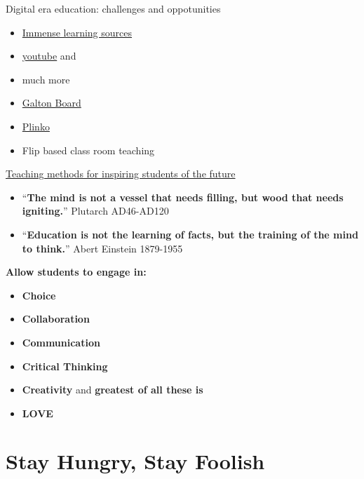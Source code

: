\documentclass[
  ignorenonframetext,
]{beamer}
\providecommand{\tightlist}{%
  \setlength{\itemsep}{0pt}\setlength{\parskip}{0pt}}\usepackage{longtable,booktabs,array}
\begin{document}
\begin{frame}{Digital era education: challenges and oppotunities}
\protect\hypertarget{digital-era-education-challenges-and-oppotunities}{}
\begin{itemize}
\tightlist
\item
  \href{khanacademy.com}{Immense learning sources}
\item
  \href{youtube.com}{youtube} and
\item
  much more
\item
  \href{https://galtonboard.com/}{Galton Board}
\item
  \href{https://phet.colorado.edu/sims/html/plinko-probability/latest/plinko-probability_en.html}{Plinko}
\item
  Flip based class room teaching
\end{itemize}
\end{frame}

\begin{frame}{}
\protect\hypertarget{section-6}{}
\href{https://www.youtube.com/watch?v=UCFg9bcW7Bk}{Teaching methods for
inspiring students of the future}

\begin{itemize}
\item
  ``\textbf{The mind is not a vessel that needs filling, but wood that
  needs igniting.}'' Plutarch AD46-AD120
\item
  ``\textbf{Education is not the learning of facts, but the training of
  the mind to think.}'' Abert Einstein 1879-1955
\end{itemize}
\end{frame}

\begin{frame}{}
\protect\hypertarget{section-7}{}
\textbf{Allow students to engage in:}

\begin{itemize}[<+->]
\item
  \textbf{Choice}
\item
  \textbf{Collaboration}
\item
  \textbf{Communication}
\item
  \textbf{Critical Thinking}
\item
  \textbf{Creativity} and {\textbf{greatest of all these is}}
\item
  {\textbf{LOVE}}
\end{itemize}
\end{frame}

\hypertarget{stay-hungry-stay-foolish}{%
\section{\texorpdfstring{{Stay Hungry, Stay
Foolish}}{Stay Hungry, Stay Foolish}}\label{stay-hungry-stay-foolish}}
\end{document}
